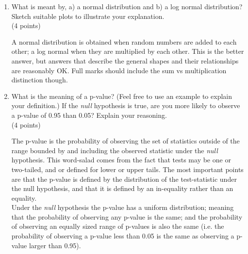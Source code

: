 \documentclass[11pt]{article}
\begin{document}
\begin{enumerate}

\item What is meant by, a) a normal distribution and b) a log normal
  distribution? Sketch suitable plots to illustrate your explanation.\\
  (4 points)

\begin{Notes}
  A normal distribution is obtained when random numbers are added to each
  other; a log normal when they are multiplied by each other. This is the
  better answer, but answers that describe the general shapes and their
  relationships are reasonably OK. Full marks should include the sum vs
  multiplication distinction though.
\end{Notes}

\item What is the meaning of a p-value? (Feel free to use an example to
  explain your definition.) If the \emph{null} hypothesis is true,
  are you more likely to observe a p-value of 0.95 than 0.05? Explain your
  reasoning.\\
(4 points)

\begin{Notes}
  The p-value is the probability of observing the set of statistics outside of
  the range bounded by and including the observed statistic under the \emph{null}
  hypothesis. This word-salad comes from the fact that tests may be one or
  two-tailed, and or defined for lower or upper tails. The most important
  points are that the p-value is defined by the distribution of the
  test-statistic under the null hypothesis, and that it is defined by an
  in-equality rather than an equality.\\
  Under the \emph{null} hypothesis the p-value has a uniform distribution;
  meaning that the probability of observing any p-value is the same; and the
  probability of observing an equally sized range of p-values is also the
  same (i.e. the probability of observing a p-value less than 0.05 is the
  same as observing a p-value larger than 0.95).
\end{Notes}


\end{enumerate}
\end{document}
